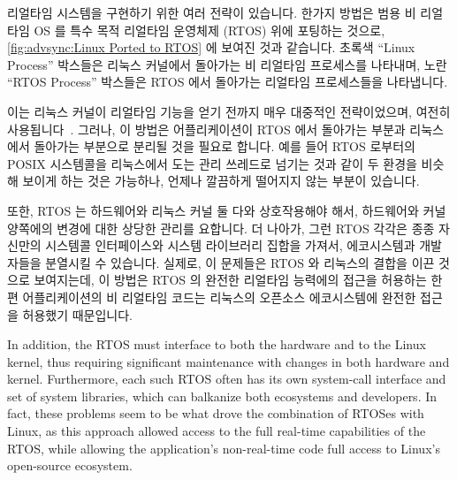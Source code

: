 리얼타임 시스템을 구현하기 위한 여러 전략이 있습니다.
한가지 방법은 범용 비 리얼타임 OS 를 특수 목적 리얼타임 운영체제 (RTOS) 위에
포팅하는 것으로,
\cref{fig:advsync:Linux Ported to RTOS} 에 보여진 것과 같습니다.
초록색 ``Linux Process'' 박스들은 리눅스 커널에서 돌아가는 비 리얼타임
프로세스를 나타내며, 노란 ``RTOS Process'' 박스들은 RTOS 에서 돌아가는 리얼타임
프로세스들을 나타냅니다.

이는 리눅스 커널이 리얼타임 기능을 얻기 전까지 매우 대중적인 전략이었으며,
여전히 사용됩니다~\cite{Xenomai2014,VictorYodaiken2004a}.
그러나, 이 방법은 어플리케이션이 RTOS 에서 돌아가는 부분과 리눅스에서 돌아가는
부분으로 분리될 것을 필요로 합니다.
예를 들어 RTOS 로부터의 POSIX 시스템콜을 리눅스에서 도는 관리 쓰레드로 넘기는
것과 같이 두 환경을 비슷해 보이게 하는 것은 가능하나, 언제나 깔끔하게 떨어지지
않는 부분이 있습니다.

또한, RTOS 는 하드웨어와 리눅스 커널 둘 다와 상호작용해야 해서, 하드웨어와 커널
양쪽에의 변경에 대한 상당한 관리를 요합니다.
더 나아가, 그런 RTOS 각각은 종종 자신만의 시스템콜 인터페이스와 시스템
라이브러리 집합을 가져서, 에코시스템과 개발자들을 분열시킬 수 있습니다.
실제로, 이 문제들은 RTOS 와 리눅스의 결합을 이끈 것으로 보여지는데, 이 방법은
RTOS 의 완전한 리얼타임 능력에의 접근을 허용하는 한편 어플리케이션의 비
리얼타임 코드는 리눅스의 오픈소스 에코시스템에 완전한 접근을 허용했기
때문입니다.

\iffalse

In addition, the RTOS must interface to both the hardware and to
the Linux kernel, thus requiring significant maintenance with
changes in both hardware and kernel.
Furthermore, each such RTOS often has its own system-call interface
and set of system libraries, which can balkanize both ecosystems and
developers.
In fact, these problems seem to be what drove the combination of
RTOSes with Linux, as this approach allowed access to the full real-time
capabilities of the RTOS, while allowing the application's non-real-time
code full access to Linux's open-source ecosystem.


